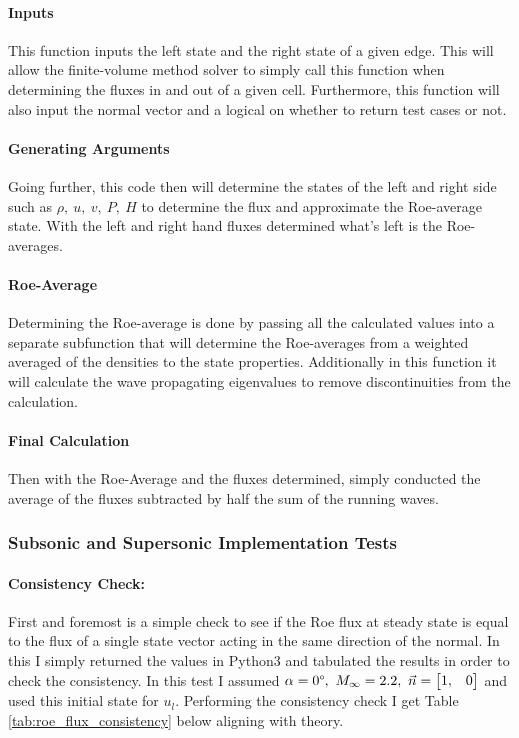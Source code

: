\paragraph{Inputs} This function inputs the left state and the right state of a given edge. This will allow the finite-volume method solver to simply call this function when determining the fluxes in and out of a given cell. Furthermore, this function will also input the normal vector and a logical on whether to return test cases or not.

\paragraph{Generating Arguments} Going further, this code then will determine the states of the left and right side such as $\rho,\ u,\ v,\ P,\ H$ to determine the flux and approximate the Roe-average state. With the left and right hand fluxes determined what's left is the Roe-averages.

\paragraph{Roe-Average} Determining the Roe-average is done by passing all the calculated values into a separate subfunction that will determine the Roe-averages from a weighted averaged of the densities to the state properties. Additionally in this function it will calculate the wave propagating eigenvalues to remove discontinuities from the calculation.

\paragraph{Final Calculation} Then with the Roe-Average and the fluxes determined, simply conducted the average of the fluxes subtracted by half the sum of the running waves.\cite{notes:gryphon}

\pagebreak
\subsubsection{Subsonic and Supersonic Implementation Tests}

\paragraph{Consistency Check:} First and foremost is a simple check to see if the Roe flux at steady state is equal to the flux of a single state vector acting in the same direction of the normal. In this I simply returned the values in Python3 and tabulated the results in order to check the consistency. In this test I assumed $\alpha = 0\degree,\ M_\infty = 2.2,\ \vec{n} = \begin{bmatrix} 1, & 0 \end{bmatrix}$ and used this initial state for $u_l$. Performing the consistency check I get Table \ref{tab:roe_flux_consistency} below aligning with theory.

